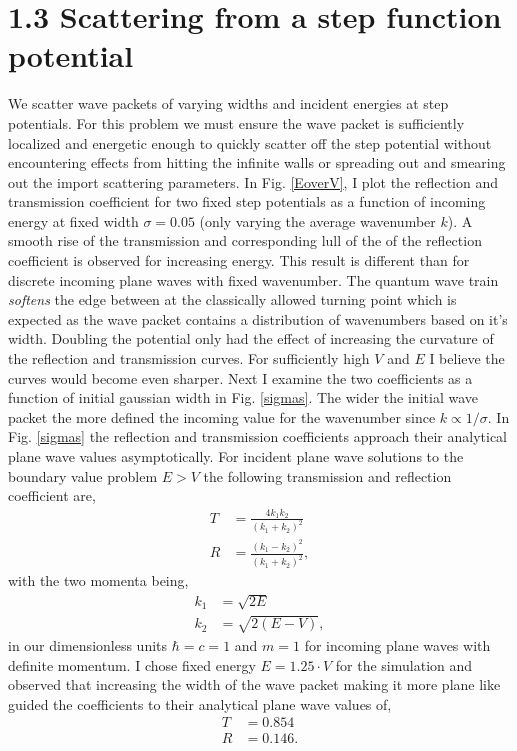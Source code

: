 \documentclass[singlepage,notitlepage,nofootinbib,11pt]{revtex4-1}
\begin{document}
\section*{1.3 Scattering from a step function potential}
We scatter wave packets of varying widths and incident energies at step potentials. For this problem we must ensure the wave packet is sufficiently localized and energetic enough to quickly scatter off the step potential without encountering effects from hitting the infinite walls or spreading out and smearing out the import scattering parameters. In Fig. \ref{EoverV}, I plot the reflection and transmission coefficient for two fixed step potentials as a function of incoming energy at fixed width $\sigma=0.05$ (only varying the average wavenumber $k$). A smooth rise of the transmission and corresponding lull of the of the reflection coefficient is observed for increasing energy. This result is different than for discrete incoming plane waves with fixed wavenumber. The quantum wave train \emph{softens} the edge between at the classically allowed turning point which is expected as the wave packet contains a distribution of wavenumbers based on it's width. Doubling the potential only had the effect of increasing the curvature of the reflection and transmission curves. For sufficiently high $V$ and $E$ I believe the curves would become even sharper. Next I examine the two coefficients as a function of initial gaussian width in Fig. \ref{sigmas}. The wider the initial wave packet the more defined the incoming value for the wavenumber since $k\propto 1/\sigma$. In Fig. \ref{sigmas} the reflection and transmission coefficients approach their analytical plane wave values asymptotically. For incident plane wave solutions to the boundary value problem $E>V$ the following transmission and reflection coefficient are,
\begin{align*}
T &= \frac{4 k_1 k_2 }{(k_1 + k_2)^2}\\
R &= \frac{(k_1 - k_2)^2}{(k_1+k_2)^2},
\end{align*}
with the two momenta being,
\begin{align*}
k_1 &= \sqrt{2E}\\
k_2 &= \sqrt{2(E-V)},
\end{align*}
in our dimensionless units $\hbar=c=1$ and $m=1$ for incoming plane waves with definite momentum. I chose fixed energy $E=1.25\cdot V$ for the simulation and observed that increasing the width of the wave packet making it more plane like guided the coefficients to their analytical plane wave values of,
\begin{align*}
T&=0.854\\
R&=0.146.
\end{align*}
\end{document}
